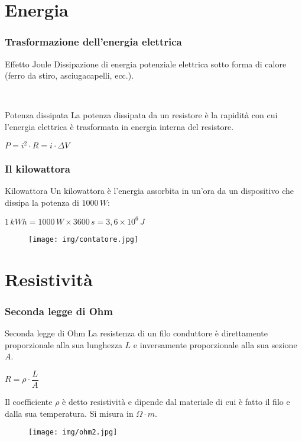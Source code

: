 \documentclass[]{beamer}
\theoremstyle{plain}
\begin{document}
\section{Energia}


\begin{frame}
  \frametitle{Trasformazione dell'energia elettrica}
  \begin{block}{Effetto Joule}
  Dissipazione di energia potenziale elettrica sotto forma di calore (ferro da stiro, asciugacapelli, ecc.).
  \end{block}\pause
  
  ~
  
  \begin{block}{Potenza dissipata}
    La potenza dissipata da un resistore è la rapidità con cui l'energia elettrica è trasformata in energia interna del resistore.
  \begin{center}
\colorbox{marroncino!30}{$ P = i^2 \cdot R = i \cdot \Delta V $}
\end{center}
  \end{block}
\end{frame}



\begin{frame}
  \frametitle{Il kilowattora}
  \begin{block}{Kilowattora}
  Un kilowattora è l’energia assorbita in un'ora da un dispositivo che dissipa la potenza di $1000\, W$:
  \begin{center}
\colorbox{marroncino!30}{$ 1 \, kWh = 1000 \, W \times 3600 \, s = 3,6 \times 10^6 \, J $}
\end{center}
  \end{block}
    \begin{figure}
  \texttt{[image: img/contatore.jpg]}
    \end{figure}
\end{frame}

\section{Resistività}


\begin{frame}
\frametitle{Seconda legge di Ohm}
\begin{block}{Seconda legge di Ohm}
  La resistenza di un filo conduttore è direttamente proporzionale alla sua lunghezza $ L $ e inversamente proporzionale alla sua sezione $ A $.
  \begin{center}
    \colorbox{marroncino!30}{$ R = \rho \cdot \dfrac{L}{A} $}
  \end{center}
  Il coefficiente $ \rho $ è detto \alert{resistività} e dipende dal materiale di cui è fatto il filo e dalla sua temperatura. Si misura in $ \Omega \cdot m $.
\end{block}
\begin{figure}
  \texttt{[image: img/ohm2.jpg]}
\end{figure}
\end{frame}
\end{document}
